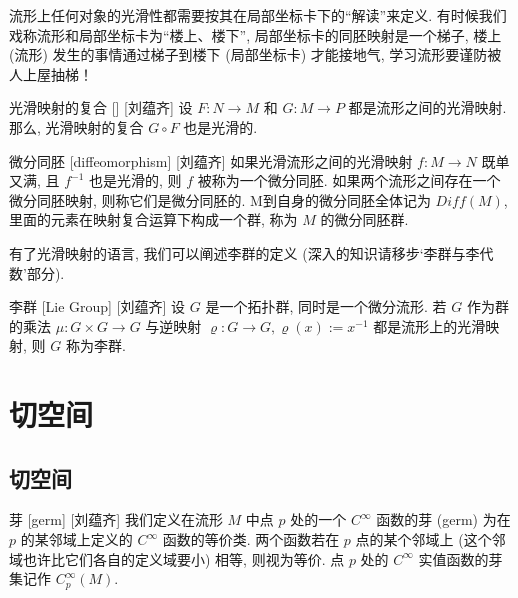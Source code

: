 \documentclass[UTF8]{ctexart}
\begin{document}
        \begin{rmk}
            []
            流形上任何对象的光滑性都需要按其在局部坐标卡下的“解读”来定义. 
            有时候我们戏称流形和局部坐标卡为“楼上、楼下”, 局部坐标卡的同胚映射是一个梯子, 楼上 (流形) 发生的事情通过梯子到楼下 (局部坐标卡) 才能接地气, 
            学习流形要谨防被人上屋抽梯！
        \end{rmk}

        \begin{ppt}
            []
            {光滑映射的复合}
            []
            [刘蕴齐]
            设 \(F: N \to M\)  和  \(G: M \to P\) 都是流形之间的光滑映射. 那么, 光滑映射的复合 \(G \circ F\) 也是光滑的. 
        \end{ppt}
        
        \vspace{10pt}
        
        \begin{dfn}
            []
            {微分同胚}
            [diffeomorphism]
            [刘蕴齐]
            如果光滑流形之间的光滑映射 \( f:M \to N\) 既单又满, 且 \(f^{-1}\) 也是光滑的, 
            则 \(f\) 被称为一个微分同胚. 
            如果两个流形之间存在一个微分同胚映射, 则称它们是微分同胚的. 
            M到自身的微分同胚全体记为 \(Diff(M)\),
            里面的元素在映射复合运算下构成一个群, 称为 \(M\) 的微分同胚群. 
        \end{dfn}

        有了光滑映射的语言, 我们可以阐述李群的定义 (深入的知识请移步‘李群与李代数’部分). 

        \begin{dfn}
            []
            {李群}
            [Lie Group]
            [刘蕴齐]
            设 \(G\) 是一个拓扑群, 同时是一个微分流形. 若 \(G\) 作为群的乘法 \(\mu: G \times G \to G\) 与逆映射
             \(\varrho: G \to G, \varrho(x):= x^{-1}\) 
            都是流形上的光滑映射, 则 \(G\) 称为李群. 
        \end{dfn}

    
\section{切空间}

    \subsection{切空间}

        \begin{dfn}
            []
            {芽}
            [germ]
            [刘蕴齐]
            我们定义在流形 \(M\) 中点 \(p\) 处的一个 \(C^{\infty}\) 函数的芽 (germ) 为在 \(p\) 的某邻域上定义的 \(C^{\infty}\) 函数的等价类. 两个函数若在 \(p\) 点的某个邻域上 (这个邻域也许比它们各自的定义域要小) 相等, 则视为等价. 点 \(p\) 处的 \(C^{\infty}\) 实值函数的芽集记作 \(C^{\infty}_p(M)\). 
        \end{dfn}
\end{document}
